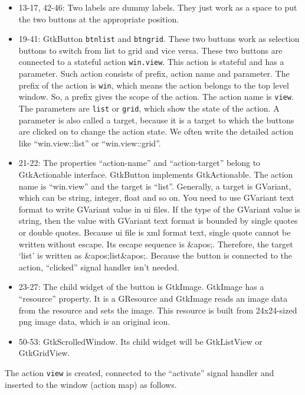 \begin{itemize}
\tightlist
\item
  13-17, 42-46: Two labels are dummy labels. They just work as a space
  to put the two buttons at the appropriate position.
\item
  19-41: GtkButton \passthrough{\lstinline!btnlist!} and
  \passthrough{\lstinline!btngrid!}. These two buttons work as selection
  buttons to switch from list to grid and vice versa. These two buttons
  are connected to a stateful action \passthrough{\lstinline!win.view!}.
  This action is stateful and has a parameter. Such action consists of
  prefix, action name and parameter. The prefix of the action is
  \passthrough{\lstinline!win!}, which means the action belongs to the
  top level window. So, a prefix gives the scope of the action. The
  action name is \passthrough{\lstinline!view!}. The parameters are
  \passthrough{\lstinline!list!} or \passthrough{\lstinline!grid!},
  which show the state of the action. A parameter is also called a
  target, because it is a target to which the buttons are clicked on to
  change the action state. We often write the detailed action like
  ``win.view::list'' or ``win.view::grid''.
\item
  21-22: The properties ``action-name'' and ``action-target'' belong to
  GtkActionable interface. GtkButton implements GtkActionable. The
  action name is ``win.view'' and the target is ``list''. Generally, a
  target is GVariant, which can be string, integer, float and so on. You
  need to use GVariant text format to write GVariant value in ui files.
  If the type of the GVariant value is string, then the value with
  GVariant text format is bounded by single quotes or double quotes.
  Because ui file is xml format text, single quote cannot be written
  without escape. Its escape sequence is \&apos;. Therefore, the target
  `list' is written as \&apos;list\&apos;. Because the button is
  connected to the action, ``clicked'' signal handler isn't needed.
\item
  23-27: The child widget of the button is GtkImage. GtkImage has a
  ``resource'' property. It is a GResource and GtkImage reads an image
  data from the resource and sets the image. This resource is built from
  24x24-sized png image data, which is an original icon.
\item
  50-53: GtkScrolledWindow. Its child widget will be GtkListView or
  GtkGridView.
\end{itemize}

The action \passthrough{\lstinline!view!} is created, connected to the
``activate'' signal handler and inserted to the window (action map) as
follows.

